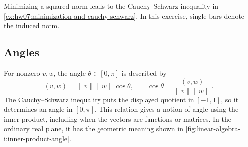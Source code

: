 Minimizing a squared norm leads to the Cauchy--Schwarz inequality in
\autoref{ex:hw07:minimization-and-cauchy-schwarz}. In this exercise,
single bars denote the induced norm.


\subsection{Angles}

For nonzero \(v,w\), the angle \(\theta\in[0,\pi]\) is described by
\[
  (v,w)=\lVert v\rVert\lVert w\rVert\cos\theta,
  \qquad
  \cos\theta=\frac{(v,w)}{\lVert v\rVert\lVert w\rVert}.
\]
The Cauchy--Schwarz inequality puts the displayed quotient in
\([-1,1]\), so it determines an angle in \([0,\pi]\).
This relation gives a notion of angle using the inner product, including
when the vectors are functions or matrices. In the ordinary real plane,
it has the geometric meaning shown in
\autoref{fig:linear-algebra-i:inner-product-angle}.

\begin{marginfigure}
  \centering
  
  \caption[Lengths and angle from an inner product]{A real-plane
    schematic with the ordinary dot product. The vectors have lengths
    \(\lVert v\rVert\), \(\lVert w\rVert\), and angle \(\theta\).}
  \label{fig:linear-algebra-i:inner-product-angle}
\end{marginfigure}
